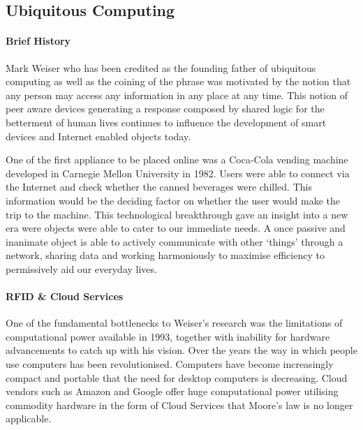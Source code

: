 \documentclass[a4paper, 11pt]{article}
\begin{document}
\vspace{\baselineskip}
\vspace{\baselineskip}
\vspace{\baselineskip}

\subsection{Ubiquitous Computing}

\paragraph{Brief History} Mark Weiser who has been credited as the founding father of ubiquitous computing as well as the coining of the phrase was motivated by the notion that any person may access any information in any place at any time.\cite{weiser} This notion of peer aware devices generating a response composed by shared logic for the betterment of human lives continues to influence the development of smart devices and Internet enabled objects today.  

One of the first appliance to be placed online was a Coca-Cola vending machine developed in Carnegie Mellon University in 1982. Users were able to connect via the Internet and check whether the canned beverages were chilled. This information would be the deciding factor on whether the user would make the trip to the machine. This technological breakthrough gave an insight into a new era were objects were able to cater to our immediate needs. A once passive and inanimate object is able to actively communicate with other `things' through a network, sharing data and working harmoniously to maximise efficiency to permissively aid our everyday lives.

\paragraph{RFID \& Cloud Services}One of the fundamental bottlenecks to Weiser's research was the limitations of computational power available in 1993\cite{weiserLimit}, together with inability for hardware advancements to catch up with his vision. Over the years the way in which people use computers has been revolutionised. Computers have become increasingly compact and portable that the need for desktop computers is decreasing. Cloud vendors such as Amazon and Google offer huge computational power utilising commodity hardware in the form of Cloud Services that Moore's law is no longer applicable\cite{HadoopInAction}. 
\end{document}
